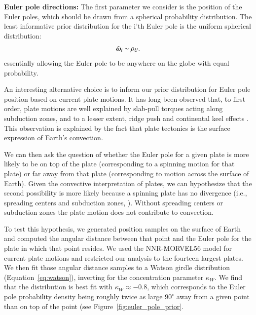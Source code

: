 \documentclass[preprint,12pt,authoryear]{elsarticle}
\newcommand{\mitbf}[1]{\hbox{\mathversion{bold}$#1$}}
\begin{document}
\textbf{Euler pole directions:} 
The first parameter we consider is the position of the Euler poles, which should be drawn
from a spherical probability distribution.
The least informative prior distribution for the i'th Euler pole is the uniform spherical distribution:
\begin{equation}
\hat{\mitbf{\omega}}_i \sim \rho_U.
\end{equation}
essentially allowing the Euler pole to be anywhere on the globe with equal probability.

An interesting alternative choice is to inform our prior distribution for Euler pole position based
on current plate motions. It has long been observed that, to first order, plate motions
are well explained by slab-pull torques acting along subduction zones, and to a lesser
extent, ridge push and continental keel effects \citep{forsyth1975relative, gordon1978absolute, richardson1992ridge}.
This observation is explained by the fact that plate tectonics is the 
surface expression of Earth's convection.

We can then ask the question of whether the Euler pole for a given plate is more likely
to be on top of the plate (corresponding to a spinning motion for that plate) or far away
from that plate (corresponding to motion across the surface of Earth).
Given the convective interpretation of plates, we can hypothesize that the second possibility
is more likely because a spinning plate has no divergence 
(i.e., spreading centers and subduction zones, \citep{forte1987plate, gable1991convection}). 
Without spreading centers or subduction zones the plate motion does not contribute to convection.

To test this hypothesis, we generated position samples on the surface of Earth and computed
the angular distance between that point and the Euler pole for the plate in which that point resides.
We used the NNR-MORVEL56 model for current plate motions \cite{argus2011geologically}
and restricted our analysis to the fourteen largest plates.
We then fit those angular distance samples to a Watson girdle distribution (Equation~\eqref{eq:watson}), 
inverting for the concentration parameter $\kappa_W$.
We find that the distribution is best fit with $\kappa_W \approx -0.8$, which corresponds
to the Euler pole probability density being roughly twice as large $90^\circ$
away from a given point than on top of the point (see Figure~\ref{fig:euler_pole_prior}.
\end{document}
